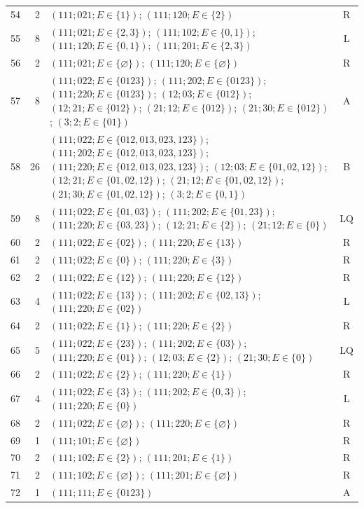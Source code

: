 \begin{longtable}{@{}r r p{10.1cm} c@{}}
54 & 2 & $(111;021;E\in\{1\})$; $(111;120;E\in\{2\})$ & R\\[1mm]
55 & 8 & $(111;021;E\in\{2,3\})$; $(111;102;E\in\{0,1\})$; $(111;120;E\in\{0,1\})$; $(111;201;E\in\{2,3\})$ & L\\[1mm]
56 & 2 & $(111;021;E\in\{\varnothing\})$; $(111;120;E\in\{\varnothing\})$ & R\\[1mm]
57 & 8 & $(111;022;E\in\{0123\})$; $(111;202;E\in\{0123\})$; $(111;220;E\in\{0123\})$; $(12;03;E\in\{012\})$; $(12;21;E\in\{012\})$; $(21;12;E\in\{012\})$; $(21;30;E\in\{012\})$; $(3;2;E\in\{01\})$ & A\\[1mm]
58 & 26 & $(111;022;E\in\{012,013,023,123\})$; $(111;202;E\in\{012,013,023,123\})$; $(111;220;E\in\{012,013,023,123\})$; $(12;03;E\in\{01,02,12\})$; $(12;21;E\in\{01,02,12\})$; $(21;12;E\in\{01,02,12\})$; $(21;30;E\in\{01,02,12\})$; $(3;2;E\in\{0,1\})$ & B\\[1mm]
59 & 8 & $(111;022;E\in\{01,03\})$; $(111;202;E\in\{01,23\})$; $(111;220;E\in\{03,23\})$; $(12;21;E\in\{2\})$; $(21;12;E\in\{0\})$ & LQ\\[1mm]
60 & 2 & $(111;022;E\in\{02\})$; $(111;220;E\in\{13\})$ & R\\[1mm]
61 & 2 & $(111;022;E\in\{0\})$; $(111;220;E\in\{3\})$ & R\\[1mm]
62 & 2 & $(111;022;E\in\{12\})$; $(111;220;E\in\{12\})$ & R\\[1mm]
63 & 4 & $(111;022;E\in\{13\})$; $(111;202;E\in\{02,13\})$; $(111;220;E\in\{02\})$ & L\\[1mm]
64 & 2 & $(111;022;E\in\{1\})$; $(111;220;E\in\{2\})$ & R\\[1mm]
65 & 5 & $(111;022;E\in\{23\})$; $(111;202;E\in\{03\})$; $(111;220;E\in\{01\})$; $(12;03;E\in\{2\})$; $(21;30;E\in\{0\})$ & LQ\\[1mm]
66 & 2 & $(111;022;E\in\{2\})$; $(111;220;E\in\{1\})$ & R\\[1mm]
67 & 4 & $(111;022;E\in\{3\})$; $(111;202;E\in\{0,3\})$; $(111;220;E\in\{0\})$ & L\\[1mm]
68 & 2 & $(111;022;E\in\{\varnothing\})$; $(111;220;E\in\{\varnothing\})$ & R\\[1mm]
69 & 1 & $(111;101;E\in\{\varnothing\})$ & R\\[1mm]
70 & 2 & $(111;102;E\in\{2\})$; $(111;201;E\in\{1\})$ & R\\[1mm]
71 & 2 & $(111;102;E\in\{\varnothing\})$; $(111;201;E\in\{\varnothing\})$ & R\\[1mm]
72 & 1 & $(111;111;E\in\{0123\})$ & A\\[1mm]

\end{longtable}
